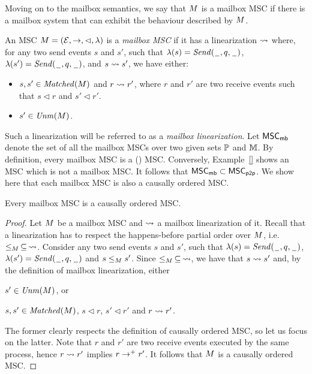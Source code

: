 \documentclass{article}
\begin{document}
\medskip

Moving on to the mailbox semantics, we say that $M$ is a mailbox MSC if there is a mailbox system that can exhibit the behaviour described by $M$. 

\begin{definition}\label{def:mb_msc}
An MSC $M = (\mathcal{E},\to,\lhd,\lambda)$ is a \emph{mailbox MSC} if it has a linearization $\rightsquigarrow$ where, for any two send events $s$ and $s'$, such that $\lambda(s)={\mathit{Send}(\hspace{0.1em}\underline{\hspace{0.5em}}\hspace{0.1em},q,\hspace{0.1em}\underline{\hspace{0.5em}}\hspace{0.1em})}$, $\lambda(s')={\mathit{Send}(\hspace{0.1em}\underline{\hspace{0.5em}}\hspace{0.1em},q,\hspace{0.1em}\underline{\hspace{0.5em}}\hspace{0.1em})}$, and $s \rightsquigarrow s'$, we have either:
\begin{itemize}\itemsep=0.5ex
	\item $s,s' \in \mathit{Matched}(M)$ and $r \rightsquigarrow r'$, where $r$ and $r'$ are two receive events such that $s \lhd r$ and $s' \lhd r'$.
	\item $s' \in \mathit{Unm}(M)$.
\end{itemize}
\end{definition}

Such a linearization will be referred to as a \emph{mailbox linearization}. Let $\mathsf{MSC}_{\mathsf{mb}}$ denote the set of all the mailbox MSCs over two given sets $\mathbb{P}$ and $\mathbb{M}$. By definition, every mailbox MSC is a (\pp) MSC. Conversely, Example~\ref{} shows an MSC which is not a mailbox MSC. It follows that $\mathsf{MSC}_{\mathsf{mb}} \subset \mathsf{MSC}_{\mathsf{p2p}}$. We show here that each mailbox MSC is also a causally ordered MSC.

\begin{proposition}\label{prop:mb_is_co}
	Every mailbox MSC is a causally ordered MSC.
\end{proposition}
\begin{proof}
Let $M$ be a mailbox MSC and $\rightsquigarrow$ a mailbox linearization of it. Recall that a linearization has to respect the happens-before partial order over $M$, i.e. $\le_M \,\subseteq\, \rightsquigarrow$. Consider any two send events $s$ and $s'$, such that $\lambda(s)={\mathit{Send}(\hspace{0.1em}\underline{\hspace{0.5em}}\hspace{0.1em},q,\hspace{0.1em}\underline{\hspace{0.5em}}\hspace{0.1em})}$, $\lambda(s')={\mathit{Send}(\hspace{0.1em}\underline{\hspace{0.5em}}\hspace{0.1em},q,\hspace{0.1em}\underline{\hspace{0.5em}}\hspace{0.1em})}$ and $s \le_M s'$. Since $\le_M \,\subseteq\, \rightsquigarrow$, we have that $s \rightsquigarrow s'$ and, by the definition of mailbox linearization, either
\begin{enumerate*}[label={(\roman*)}]
	\item $s' \in \mathit{Unm}(M)$, or 
	\item $s,s' \in \mathit{Matched}(M)$, $s \lhd r$, $s' \lhd r'$ and $r \rightsquigarrow r'$. 
\end{enumerate*}
The former clearly respects the definition of causally ordered MSC, so let us focus on the latter. Note that $r$ and $r'$ are two receive events executed by the same process, hence $r \rightsquigarrow r'$ implies $r \to^+ r'$. It follows that $M$ is a causally ordered MSC.
\end{proof}
\end{document}

